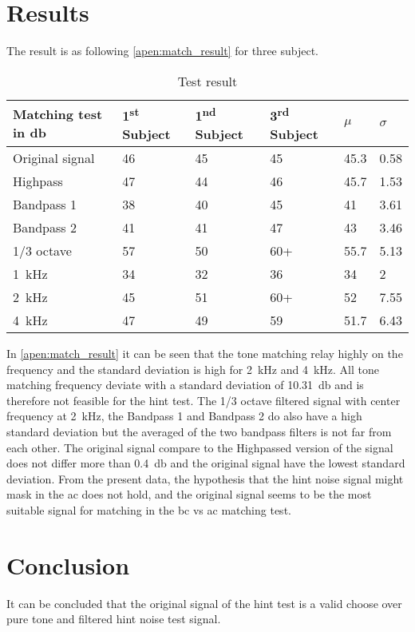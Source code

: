 \section*{Results}

The result is as following \autoref{apen:match_result} for three subject. 

\begin{table}[H]
\centering
\caption{Test result}
\begin{tabular}{l|lll|ll}
Matching test in \si{\decibel}       & 1\textsuperscript{st}  Subject & 1\textsuperscript{nd}  Subject & 3\textsuperscript{rd}  Subject & $\mu$ & $\sigma$ \\ \hline
Original signal         & 46        & 45        & 45        & 45.3        & 0.58               \\
Highpass         & 47        & 44        & 46        & 45.7        & 1.53               \\
Bandpass 1         & 38        & 40        & 45        & 41          & 3.61               \\
Bandpass 2        & 41        & 41        & 47        & 43          & 3.46               \\
1/3 octave & 57        & 50        & 60+       & 55.7        & 5.13               \\
\SI{1}{\kilo\hertz}                   & 34        & 32        & 36        & 34          & 2                  \\
\SI{2}{\kilo\hertz}                  & 45        & 51        & 60+       & 52          & 7.55               \\
\SI{4}{\kilo\hertz}                  & 47        & 49        & 59        & 51.7        &  6.43                 
\end{tabular}
\label{apen:match_result}
\end{table}

In \autoref{apen:match_result} it can be seen that the tone matching relay highly on the frequency and the standard deviation is high for \SI{2}{\kilo\hertz}  and \SI{4}{\kilo\hertz}. All tone matching frequency deviate with a standard deviation of \SI{10.31}{\decibel} and is therefore not feasible for the \gls{hint} test. The 1/3 octave filtered signal with center frequency at \SI{2}{\kilo\hertz}, the Bandpass 1 and Bandpass 2 do also have a high standard deviation but the averaged of the two bandpass filters is not far from each other. The original signal compare to the Highpassed version of the signal does not differ more than \SI{0.4}{\decibel} and the original signal have the lowest standard deviation. From the present data, the hypothesis that the \gls{hint} noise signal might mask in the \gls{ac} does not hold, and the original signal seems to be the most suitable signal for matching in the \gls{bc} vs \gls{ac} matching test.

\section*{Conclusion}
It can be concluded that the original signal of the \gls{hint} test is a valid choose over pure tone and filtered \gls{hint} noise test signal.

